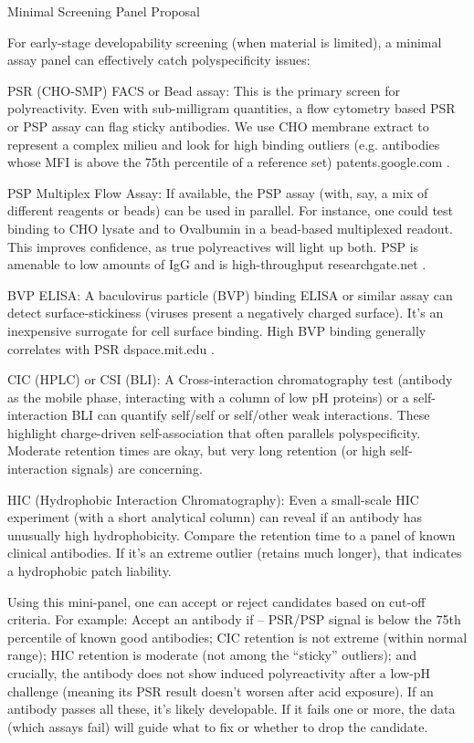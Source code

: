 Minimal Screening Panel Proposal

For early-stage developability screening (when material is limited), a minimal assay panel can effectively catch polyspecificity issues:

PSR (CHO-SMP) FACS or Bead assay: This is the primary screen for polyreactivity. Even with sub-milligram quantities, a flow cytometry based PSR or PSP assay can flag sticky antibodies. We use CHO membrane extract to represent a complex milieu and look for high binding outliers (e.g. antibodies whose MFI is above the 75th percentile of a reference set)
patents.google.com
.

PSP Multiplex Flow Assay: If available, the PSP assay (with, say, a mix of different reagents or beads) can be used in parallel. For instance, one could test binding to CHO lysate and to Ovalbumin in a bead-based multiplexed readout. This improves confidence, as true polyreactives will light up both. PSP is amenable to low amounts of IgG and is high-throughput
researchgate.net
.

BVP ELISA: A baculovirus particle (BVP) binding ELISA or similar assay can detect surface-stickiness (viruses present a negatively charged surface). It’s an inexpensive surrogate for cell surface binding. High BVP binding generally correlates with PSR
dspace.mit.edu
.

CIC (HPLC) or CSI (BLI): A Cross-interaction chromatography test (antibody as the mobile phase, interacting with a column of low pH proteins) or a self-interaction BLI can quantify self/self or self/other weak interactions. These highlight charge-driven self-association that often parallels polyspecificity. Moderate retention times are okay, but very long retention (or high self-interaction signals) are concerning.

HIC (Hydrophobic Interaction Chromatography): Even a small-scale HIC experiment (with a short analytical column) can reveal if an antibody has unusually high hydrophobicity. Compare the retention time to a panel of known clinical antibodies. If it’s an extreme outlier (retains much longer), that indicates a hydrophobic patch liability.

Using this mini-panel, one can accept or reject candidates based on cut-off criteria. For example: Accept an antibody if – PSR/PSP signal is below the 75th percentile of known good antibodies; CIC retention is not extreme (within normal range); HIC retention is moderate (not among the “sticky” outliers); and crucially, the antibody does not show induced polyreactivity after a low-pH challenge (meaning its PSR result doesn’t worsen after acid exposure). If an antibody passes all these, it’s likely developable. If it fails one or more, the data (which assays fail) will guide what to fix or whether to drop the candidate.

